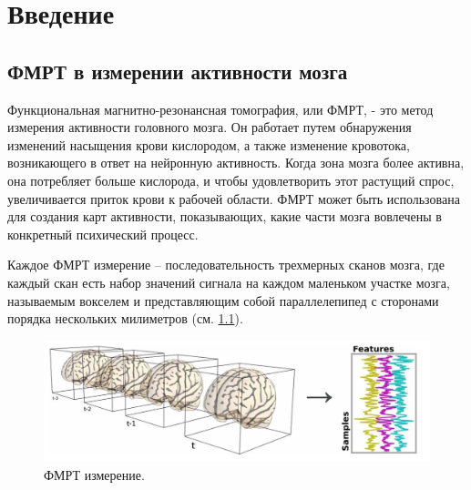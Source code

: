 \documentclass[pdftex,ptm,12pt,a4paper]{report}
\theoremstyle{definition}
\begin{document}
\tableofcontents

\sloppy

\chapter{Введение}
\section{ФМРТ в измерении активности мозга}

Функциональная магнитно-резонансная томография, или ФМРТ, - это метод измерения активности головного мозга. Он работает путем обнаружения изменений насыщения крови кислородом, а также изменение кровотока, возникающего в ответ на нейронную активность. Когда зона мозга более активна, она потребляет больше кислорода, и чтобы удовлетворить этот растущий спрос, увеличивается приток крови к рабочей области. ФМРТ может быть использована для создания карт активности, показывающих, какие части мозга вовлечены в конкретный психический процесс.

Каждое ФМРТ измерение -- последовательность трехмерных сканов мозга, где каждый скан есть набор значений сигнала на каждом маленьком участке мозга, называемым вокселем и представляющим собой параллелепипед с сторонами порядка нескольких милиметров (см. \ref{fmri_result}).

\begin{figure}[h]
\includegraphics[scale=0.2]{images/fmrt_result.png}
\centering
\caption{ФМРТ измерение.}
\label{fmri_result}
\end{figure}
\end{document}
